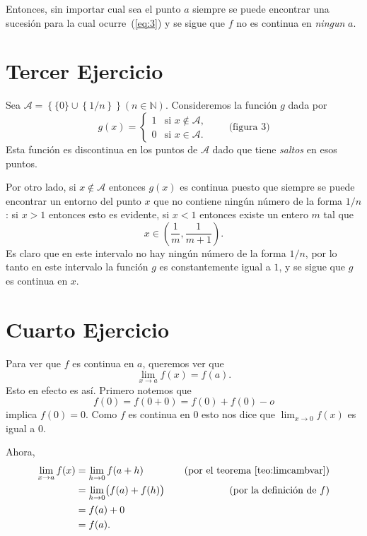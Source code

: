\documentclass[fleqn,leqno,10pt,letterpaper,final]{article}
\begin{document}
Entonces, sin importar cual sea el punto $a$ siempre se puede encontrar una
sucesión para la cual ocurre~(\ref{eq:3}) y se sigue que $f$ no es continua en \emph{ningun} $a$.


\section{Tercer Ejercicio}%
Sea $\mathcal{A}=\left\{ \{0\}\cup \left\{ 1/n \right\} \right\}(n\in\mathbb{N})$. Consideremos la función $g$ dada por 
\[
	g(x)=\begin{cases}
		1 &\text{si $x\notin \mathcal{A}$},\\
		0 &\text{si $x\in\mathcal{A}$}.
	\end{cases}\qquad\text{(figura 3)}
\]
Esta función es discontinua en los puntos de $\mathcal{A}$ dado que tiene \emph{saltos} en
esos puntos.%

 Por otro lado, si $x\notin\mathcal{A}$ entonces $g(x)$ es continua puesto que 
siempre se puede encontrar un entorno del punto $x$ que no contiene ningún
número de la forma $1/n$: si $x>1$ entonces esto es evidente, si $x<1$ entonces existe un entero $m$ tal que
\[
	x\in\left(\frac 1m, \frac{1}{m+1} \right).
\]
Es claro que en este intervalo no hay ningún número de la forma $1/n$, por lo tanto en este
intervalo la función $g$ es constantemente igual a $1$, y se sigue que $g$ es continua en $x$.

\section{Cuarto Ejercicio}%
Para ver que $f$ es continua en $a$, queremos ver que
\[
	\lim_{x\to a} f(x)=f(a).
\]
Esto en efecto es así. Primero notemos que
\[
	f(0)=f(0+0)=f(0)+f(0)-o
\]
implica $f(0)=0$. Como $f$ es continua en $0$ esto nos dice que
$ \lim_{x\to0} f(x)$ es igual a $0$.

Ahora,
\allowdisplaybreaks
\begin{align*}
	\lim_{x\to a} f(x) &= \lim_{h\to 0} f(a+h)&\quad\text{(por el teorema~\ref{teo:limcambvar})}\\
			   &= \lim_{h\to 0} \bigl(f(a)+f(h)\bigr)&\quad\text{(por la definición de $f$)}\\
			   &=f(a)+0&\\
			   &=f(a).&
\end{align*}
	
\end{document}
